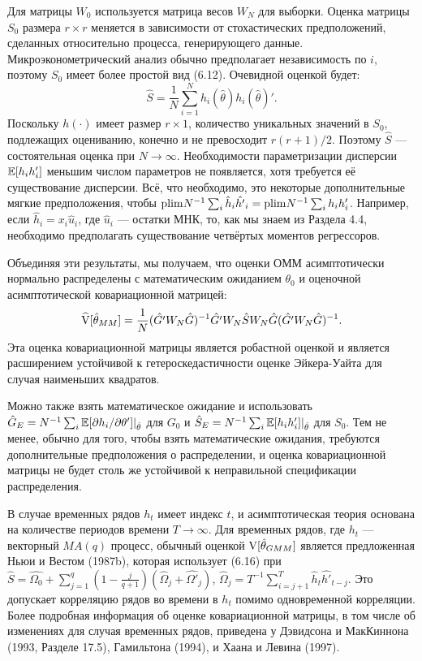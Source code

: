 Для матрицы $W_0$ используется матрица весов $W_N$ для выборки. Оценка матрицы $S_0$  размера $r \times r$ меняется в зависимости от стохастических предположений, сделанных относительно процесса, генерирующего данные. Микроэконометрический анализ обычно предполагает независимость по $i$, поэтому $S_0$ имеет более простой вид (6.12). Очевидной оценкой будет:
\begin{equation}
\hat{S}=\frac{1}{N} \sum_{i=1}^{N} h_i(\hat{\theta}) h_i(\hat{\theta})'.
\end{equation}
Поскольку $h(\cdot)$ имеет размер $r \times 1$, количество уникальных значений в $S_0$, подлежащих оцениванию, конечно и не превосходит $r(r+1)/2$. Поэтому $\hat{S}$ --- состоятельная оценка при $N \rightarrow  \infty$. Необходимости параметризации дисперсии $\mathbb{E}[h_i h'_i]$ меньшим числом параметров не появляется, хотя требуется её существование дисперсии. Всё, что необходимо, это некоторые дополнительные мягкие предположения, чтобы $\mathrm{plim } N^{-1} \sum_i \hat{h}_i \hat{h'}_i= \mathrm{plim } N^{-1} \sum_i h_i h'_i$. Например, если $\hat{h}_i=x_i \hat{u}_i$, где $\hat{u}_i$ --- остатки МНК, то, как мы знаем из Раздела 4.4, необходимо предполагать существование четвёртых моментов регрессоров.

Объединяя эти результаты, мы получаем, что оценки ОММ асимптотически нормально распределены с математическим ожиданием $\theta_0$ и оценочной асимптотической ковариационной матрицей:
\begin{equation}
\widehat{\mathrm{V}}[\hat{\theta}_{MM}]=\frac{1}{N} (\hat{G'} W_N \hat{G})^{-1} \hat{G'} W_N \hat{S}  W_N  \hat{G}(\hat{G'} W_N \hat{G})^{-1}.
\end{equation}
Эта оценка ковариационной матрицы является робастной оценкой и является расширением устойчивой к гетероскедастичности оценке Эйкера-Уайта для случая наименьших квадратов.

Можно также взять математическое ожидание и использовать $\hat{G}_{E}=N^{-1} \sum_i \mathbb{E}[\partial h_i / \partial \theta']|_{\hat{\theta}}$ для $G_0$ и $\hat{S}_{E}= N^{-1} \sum_i \mathbb{E}[h_i h'_i]|_{\hat{\theta}}$ для $S_0$. Тем не менее, обычно для того, чтобы взять математические ожидания, требуются дополнительные предположения о распределении, и оценка ковариационной матрицы не будет столь же устойчивой к неправильной спецификации распределения.

В случае временных рядов $h_t$ имеет индекс $t$, и асимптотическая теория основана на количестве периодов времени $T \rightarrow \infty$. Для временных рядов, где  $h_t$ --- векторный $MA(q)$ процесс, обычный оценкой $\mathrm{V}[\hat{\theta}_{GMM}]$ является предложенная Ньюи и Вестом (1987b), которая использует (6.16) при $\hat{S}=\hat{\Omega_0} + \sum_{j=1}^{q}(1-\frac{j}{q+1})(\hat{\Omega}_j+\hat{\Omega'}_j)$, $\hat{\Omega}_j=T^{-1} \sum_{i=j+1}^{T} \hat{h}_t \hat{h'}_{t-j}$. Это допускает корреляцию рядов во времени в $h_t$ помимо одновременной корреляции. Более подробная информация об оценке ковариационной матрицы, в том числе об изменениях для случая временных рядов, приведена у Дэвидсона и МакКиннона (1993, Разделе 17.5), Гамильтона (1994), и Хаана и Левина (1997).

